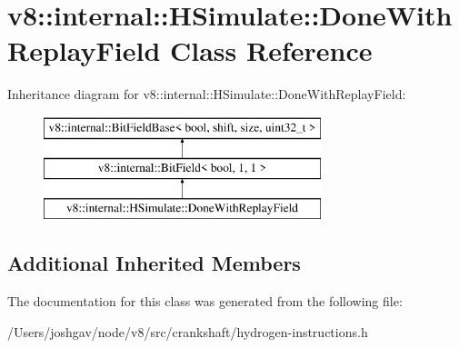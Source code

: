 \hypertarget{classv8_1_1internal_1_1_h_simulate_1_1_done_with_replay_field}{}\section{v8\+:\+:internal\+:\+:H\+Simulate\+:\+:Done\+With\+Replay\+Field Class Reference}
\label{classv8_1_1internal_1_1_h_simulate_1_1_done_with_replay_field}
Inheritance diagram for v8\+:\+:internal\+:\+:H\+Simulate\+:\+:Done\+With\+Replay\+Field\+:\begin{figure}[H]
\begin{center}
\leavevmode
\includegraphics[height=3.000000cm]{classv8_1_1internal_1_1_h_simulate_1_1_done_with_replay_field}
\end{center}
\end{figure}
\subsection*{Additional Inherited Members}


The documentation for this class was generated from the following file\+:\begin{DoxyCompactItemize}
\item 
/\+Users/joshgav/node/v8/src/crankshaft/hydrogen-\/instructions.\+h\end{DoxyCompactItemize}
